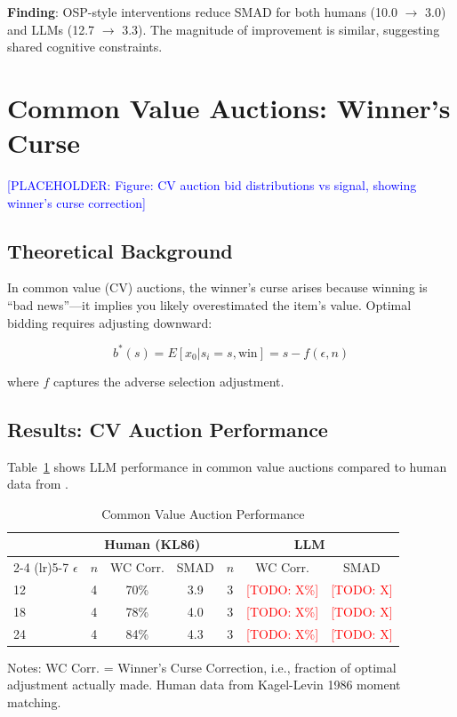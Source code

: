 \documentclass[12pt]{article}
\newcommand{\todo}[1]{\textcolor{red}{[TODO: #1]}}
\newcommand{\placeholder}[1]{\textcolor{blue}{[PLACEHOLDER: #1]}}
\begin{document}
\textbf{Finding}: OSP-style interventions reduce SMAD for both humans (10.0 $\rightarrow$ 3.0) and LLMs (12.7 $\rightarrow$ 3.3). The magnitude of improvement is similar, suggesting shared cognitive constraints.

\section{Common Value Auctions: Winner's Curse}

\placeholder{Figure: CV auction bid distributions vs signal, showing winner's curse correction}

\subsection{Theoretical Background}

In common value (CV) auctions, the winner's curse arises because winning is ``bad news''---it implies you likely overestimated the item's value. Optimal bidding requires adjusting downward:

\begin{equation}
    b^*(s) = E[x_0 | s_i = s, \text{win}] = s - f(\epsilon, n)
\end{equation}

where $f$ captures the adverse selection adjustment.

\subsection{Results: CV Auction Performance}

Table~\ref{tab:cv_results} shows LLM performance in common value auctions compared to human data from \citet{kagel1986winners}.

\begin{table}[h]
\centering
\caption{Common Value Auction Performance}
\label{tab:cv_results}
\begin{tabular}{lcccccc}
\toprule
& \multicolumn{3}{c}{\textbf{Human (KL86)}} & \multicolumn{3}{c}{\textbf{LLM}} \\
\cmidrule(lr){2-4} \cmidrule(lr){5-7}
$\epsilon$ & $n$ & WC Corr. & SMAD & $n$ & WC Corr. & SMAD \\
\midrule
12 & 4 & 70\% & 3.9 & 3 & \todo{X\%} & \todo{X} \\
18 & 4 & 78\% & 4.0 & 3 & \todo{X\%} & \todo{X} \\
24 & 4 & 84\% & 4.3 & 3 & \todo{X\%} & \todo{X} \\
\bottomrule
\end{tabular}
\smallskip
\begin{minipage}{0.95\textwidth}
\footnotesize
Notes: WC Corr. = Winner's Curse Correction, i.e., fraction of optimal adjustment actually made. Human data from Kagel-Levin 1986 moment matching.
\end{minipage}
\end{table}
\end{document}
